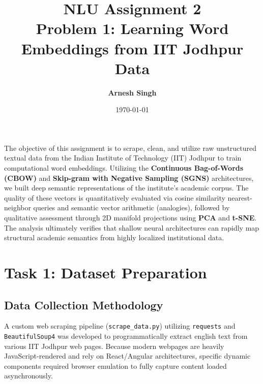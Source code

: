 \documentclass[11pt,a4paper]{article}
\title{\Huge\textbf{\color{iitjblue} NLU Assignment 2}\\[0.5em] \LARGE \color{iitjblue!80} Problem 1: Learning Word Embeddings from IIT Jodhpur Data}
\author{\Large \textbf{Arnesh Singh}}
\date{\large \today}
\begin{document}
\maketitle
\vspace{1em}

\onehalfspacing
\justifying

\begin{infoBox}
The objective of this assignment is to scrape, clean, and utilize raw unstructured textual data from the Indian Institute of Technology (IIT) Jodhpur to train computational word embeddings. Utilizing the \textbf{Continuous Bag-of-Words (CBOW)} and \textbf{Skip-gram with Negative Sampling (SGNS)} architectures, we built deep semantic representations of the institute's academic corpus. The quality of these vectors is quantitatively evaluated via cosine similarity nearest-neighbor queries and semantic vector arithmetic (analogies), followed by qualitative assessment through 2D manifold projections using \textbf{PCA} and \textbf{t-SNE}. The analysis ultimately verifies that shallow neural architectures can rapidly map structural academic semantics from highly localized institutional data.
\end{infoBox}

\vspace{1em}

\section{Task 1: Dataset Preparation}

\subsection{Data Collection Methodology}
A custom web scraping pipeline (\texttt{scrape\_data.py}) utilizing \texttt{requests} and \texttt{BeautifulSoup4} was developed to programmatically extract english text from various IIT Jodhpur web pages. Because modern webpages are heavily JavaScript-rendered and rely on React/Angular architectures, specific dynamic components required browser emulation to fully capture content loaded asynchronously.
\end{document}
